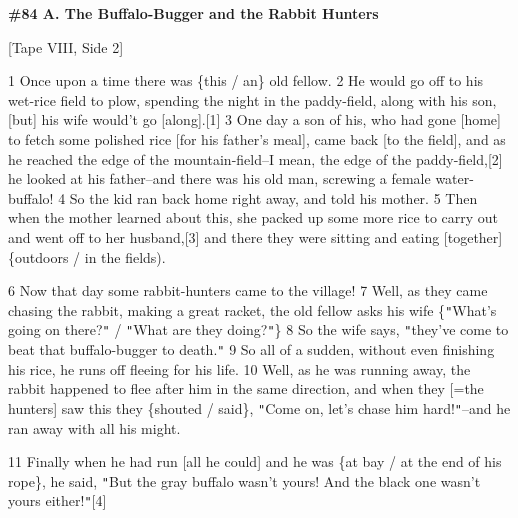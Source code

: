 
\textbf{\#84 A. The Buffalo-Bugger and the Rabbit Hunters}

[Tape VIII, Side 2]

1 Once upon a time there was \{this / an\} old fellow. 2 He would go off to his
wet-rice field to plow, spending the night in the paddy-field, along with his son,
[but] his wife would't go [along].[1] 3 One day a son of his, who had gone [home]
to fetch some polished rice [for his father's meal], came back [to the field],
and as he reached the edge of the mountain-field--I mean, the edge of the paddy-field,[2]
he looked at his father--and there was his old man, screwing a female water-buffalo!
4 So the kid ran back home right away, and told his mother. 5 Then when the mother
learned about this, she packed up some more rice to carry out and went off to her
husband,[3] and there they were sitting and eating [together] \{outdoors / in the
fields).

6 Now that day some rabbit-hunters came to the village! 7 Well, as they came chasing
the rabbit, making a great racket, the old fellow asks his wife \{\texttt{"}What's
going on there?\texttt{"} / \texttt{"}What are they doing?\texttt{"}\} 8 So the
wife says, \texttt{"}they've come to beat that buffalo-bugger to death.\texttt{"}
9 So all of a sudden, without even finishing his rice, he runs off fleeing for
his life. 10 Well, as he was running away, the rabbit happened to flee after him
in the same direction, and when they [=the hunters] saw this they \{shouted / said\},
\texttt{"}Come on, let's chase him hard!\texttt{"}--and he ran away with all his
might.

11 Finally when he had run [all he could] and he was \{at bay / at the end of his
rope\}, he said, \texttt{"}But the gray buffalo wasn't yours! And the black one
wasn't yours either!\texttt{"}[4]

